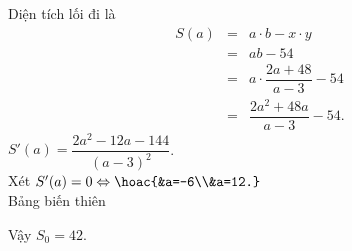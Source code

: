 \begin{ex}
{		Diện tích lối đi là
		\allowdisplaybreaks
		\begin{eqnarray*}
			S(a)&=&a\cdot b-x\cdot y\\
			&=&ab-54\\
			&=&a\cdot \dfrac{2a+48}{a-3}-54\\
			&=&\dfrac{2a^2+48a}{a-3}-54.
		\end{eqnarray*}
		$S'(a)=\dfrac{2a^2-12a-144}{\left(a-3\right)^2}$.\\
		Xét $S'(a)=0\Leftrightarrow \hoac{&a=-6\\&a=12.}$\\
		Bảng biến thiên
		\begin{center}
		\end{center}
		Vậy $S_0=42$.
	}
\end{ex}
